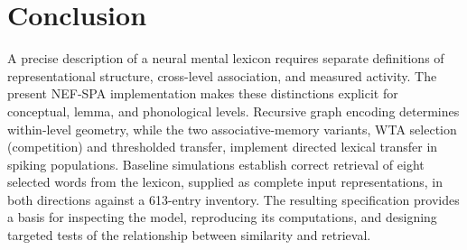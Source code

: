 \section{Conclusion}
A precise description of a neural mental lexicon requires separate definitions of representational structure, cross-level association, and measured activity. The present NEF-SPA implementation makes these distinctions explicit for conceptual, lemma, and phonological levels. Recursive graph encoding determines within-level geometry, while the two associative-memory variants, WTA selection (competition) and thresholded transfer, implement directed lexical transfer in spiking populations. Baseline simulations establish correct retrieval of eight selected words from the lexicon, supplied as complete input representations, in both directions against a 613-entry inventory. The resulting specification provides a basis for inspecting the model, reproducing its computations, and designing targeted tests of the relationship between similarity and retrieval.
